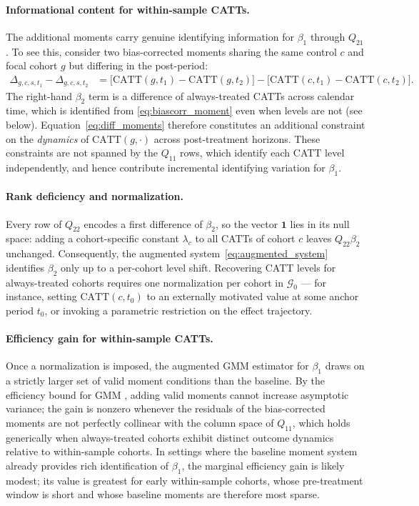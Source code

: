 \paragraph{Informational content for within-sample CATTs.}
The additional moments carry genuine identifying information for
$\beta_1$ through $Q_{21}$. To see this, consider two
bias-corrected moments sharing the same control $c$ and focal cohort
$g$ but differing in the post-period:
\begin{align}
  \Delta_{g,c,s,t_1} - \Delta_{g,c,s,t_2}
  &= \bigl[\mathrm{CATT}(g,t_1) - \mathrm{CATT}(g,t_2)\bigr]
     - \bigl[\mathrm{CATT}(c,t_1) - \mathrm{CATT}(c,t_2)\bigr].
  \label{eq:diff_moments}
\end{align}
The right-hand $\beta_2$ term is a difference of always-treated
CATTs across calendar time, which is identified from
\eqref{eq:biascorr_moment} even when levels are not (see below).
Equation~\eqref{eq:diff_moments} therefore constitutes an additional
constraint on the \emph{dynamics} of $\mathrm{CATT}(g,\cdot)$ across
post-treatment horizons. These constraints are not spanned by the
$Q_{11}$ rows, which identify each CATT level independently, and
hence contribute incremental identifying variation for $\beta_1$.

\paragraph{Rank deficiency and normalization.}
Every row of $Q_{22}$ encodes a first difference of $\beta_2$, so the
vector $\mathbf{1}$ lies in its null space: adding a cohort-specific
constant $\lambda_c$ to all CATTs of cohort $c$ leaves
$Q_{22}\beta_2$ unchanged. Consequently, the augmented
system~\eqref{eq:augmented_system} identifies $\beta_2$ only up to a
per-cohort level shift. Recovering CATT levels for always-treated
cohorts requires one normalization per cohort in $\mathcal{G}_0$
--- for instance, setting $\mathrm{CATT}(c,t_0)$ to an externally
motivated value at some anchor period $t_0$, or invoking a parametric
restriction on the effect trajectory.

\paragraph{Efficiency gain for within-sample CATTs.}
Once a normalization is imposed, the augmented GMM estimator for
$\beta_1$ draws on a strictly larger set of valid moment conditions
than the baseline. By the efficiency bound for GMM
\citep{hansen1982}, adding valid moments cannot increase asymptotic
variance; the gain is nonzero whenever the residuals of the
bias-corrected moments are not perfectly collinear with the column
space of $Q_{11}$, which holds generically when always-treated
cohorts exhibit distinct outcome dynamics relative to within-sample
cohorts. In settings where the baseline moment system already
provides rich identification of $\beta_1$, the marginal efficiency
gain is likely modest; its value is greatest for early within-sample
cohorts, whose pre-treatment window is short and whose baseline
moments are therefore most sparse.

